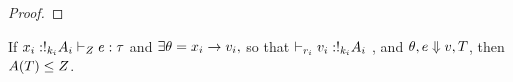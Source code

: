 \begin{proof}

  


  \end{proof} 





\begin{thm}
  If $ x_i : !_{k_i} A_i  \vdash_{Z} e : \tau$
  and  $\exists \theta = x_i \to v_i , $ so that $   \empty
  \tvdash{r_i} v_i : \bang{k_i} \ltype_i $  , and  $\theta, e \mathrel{\Downarrow} v, T $,
  then $ A(T) \leq Z  $.
\end{thm}%